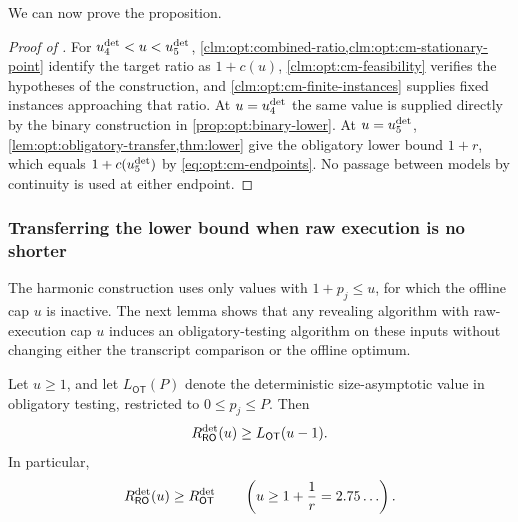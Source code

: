 We can now prove the proposition.

\begin{proof}[Proof of ]
For $u_{4}^{\mathrm{det}}<u<u_{5}^{\mathrm{det}}$,
\cref{clm:opt:combined-ratio,clm:opt:cm-stationary-point} identify the target
ratio as $1+c(u)$, \cref{clm:opt:cm-feasibility} verifies the hypotheses of
the construction, and \cref{clm:opt:cm-finite-instances} supplies fixed
instances approaching that ratio.  At $u=u_{4}^{\mathrm{det}}$ the same value is supplied
directly by the binary construction in \cref{prop:opt:binary-lower}.  At
$u=u_{5}^{\mathrm{det}}$, \cref{lem:opt:obligatory-transfer,thm:lower} give the
obligatory lower bound $1+r$, which equals $1+c(u_{5}^{\mathrm{det}})$ by
\cref{eq:opt:cm-endpoints}.  No passage between models by continuity is
used at either endpoint.
\end{proof}

\subsubsection{Transferring the lower bound when raw execution is no shorter}

The harmonic construction uses only values with $1+p_j\le u$, for which the
offline cap $u$ is inactive.  The next lemma shows that any revealing
algorithm with raw-execution cap $u$ induces an obligatory-testing algorithm
on these inputs without changing either the transcript comparison or the
offline optimum.

\begin{lemma}
\label{lem:opt:obligatory-transfer}
Let $u\ge1$, and let $L_{\mathsf{OT}}(P)$ denote the deterministic
size-asymptotic value in obligatory testing, restricted to
$0\le p_j\le P$.  Then
\begin{equation}
 R_{\mathsf{RO}}^{\mathrm{det}}(u)\ge L_{\mathsf{OT}}(u-1).
 \label{eq:opt:obligatory-transfer}
\end{equation}
In particular,
\begin{equation}
 R_{\mathsf{RO}}^{\mathrm{det}}(u)\ge R_{\mathsf{OT}}^{\mathrm{det}}
 \qquad
 \left(u\ge1+\frac1r=2.75\ldots\right).
 \label{eq:opt:high-lower}
\end{equation}
\end{lemma}

